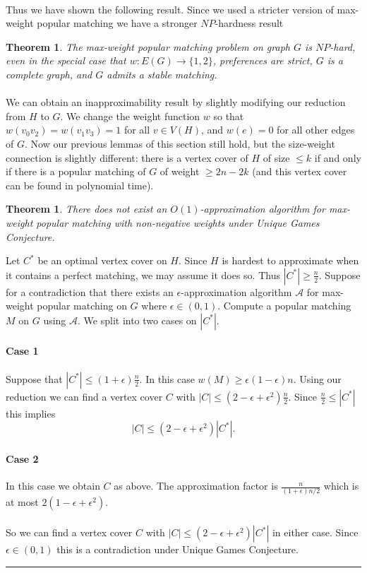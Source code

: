 \documentclass[letterpaper,12pt,oneside,onecolumn]{article}
\newcommand{\cA}{\mathcal{A}} \newcommand{\cB}{\mathcal{B}}
\newenvironment{proof}{{\bf Proof:  }}{\hfill\rule{2mm}{2mm}}
\newtheorem{theorem}[fact]{Theorem}
\begin{document}
\paragraph{}
Thus we have shown the following result. Since we used a stricter version of max-weight popular matching we have a stronger $NP$-hardness result
\begin{theorem}
The max-weight popular matching problem on graph $G$ is $NP$-hard, even in the special case that $w: E(G)\rightarrow \{1,2\}$, preferences are strict, $G$ is a complete graph, and $G$ admits a stable matching.
\end{theorem}
\paragraph{}
We can obtain an inapproximability result by slightly modifying our reduction from $H$ to $G$. We change the weight function $w$ so that $w(v_0v_2) = w(v_1v_3) = 1$ for all $v \in V(H)$, and $w(e) = 0$ for all other edges of $G$. Now our previous lemmas of this section still hold, but the size-weight connection is slightly different: there is a vertex cover of $H$ of size $\leq k$ if and only if there is a popular matching of $G$ of weight $\geq 2n-2k$ (and this vertex cover can be found in polynomial time).
\begin{theorem}
There does not exist an $O(1)$-approximation algorithm for max-weight popular matching with non-negative weights under Unique Games Conjecture.
\end{theorem}
\begin{proof}
Let $C^*$ be an optimal vertex cover on $H$. Since $H$ is hardest to approximate when it contains a perfect matching, we may assume it does so. Thus $|C^*| \geq \frac{n}{2}$. Suppose for a contradiction that there exists an $\epsilon$-approximation algorithm $\cA$ for max-weight popular matching on $G$ where $\epsilon  \in (0,1)$. Compute a popular matching $M$ on $G$ using $\cA$. We split into two cases on $|C^*|$.
\paragraph{Case 1}
Suppose that $|C^*| \leq (1+\epsilon)\frac{n}{2}$. In this case $w(M) \geq \epsilon(1-\epsilon) n$. Using our reduction we can find a vertex cover $C$ with $|C| \leq (2-\epsilon+\epsilon^2)\frac{n}{2}$. Since $\frac{n}{2} \leq |C^*|$ this implies
$$|C| \leq (2-\epsilon +\epsilon^2)|C^*|.$$
\paragraph{Case 2}
In this case we obtain $C$ as above. The approximation factor is $\frac{n}{(1+\epsilon)n/2}$ which is at most $2(1-\epsilon + \epsilon^2)$.
\paragraph{}
So we can find a vertex cover $C$ with $|C| \leq (2-\epsilon + \epsilon^2)|C^*|$ in either case. Since $\epsilon \in (0,1)$ this is a contradiction under Unique Games Conjecture.
\end{proof}
\end{document}
